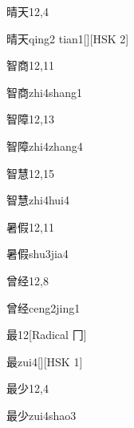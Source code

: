 \begin{entry}{晴天}{12,4}
  \begin{phonetics}{晴天}{qing2 tian1}[][HSK 2]
  \end{phonetics}
\end{entry}

\begin{entry}{智商}{12,11}
  \begin{phonetics}{智商}{zhi4shang1}
  \end{phonetics}
\end{entry}

\begin{entry}{智障}{12,13}
  \begin{phonetics}{智障}{zhi4zhang4}
  \end{phonetics}
\end{entry}

\begin{entry}{智慧}{12,15}
  \begin{phonetics}{智慧}{zhi4hui4}
  \end{phonetics}
\end{entry}

\begin{entry}{暑假}{12,11}
  \begin{phonetics}{暑假}{shu3jia4}
  \end{phonetics}
\end{entry}

\begin{entry}{曾经}{12,8}
  \begin{phonetics}{曾经}{ceng2jing1}
  \end{phonetics}
\end{entry}

\begin{entry}{最}{12}[Radical 冂]
  \begin{phonetics}{最}{zui4}[][HSK 1]
  \end{phonetics}
\end{entry}

\begin{entry}{最少}{12,4}
  \begin{phonetics}{最少}{zui4shao3}
  \end{phonetics}
\end{entry}


